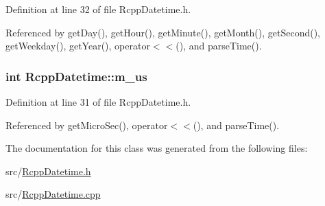 Definition at line 32 of file RcppDatetime.h.

Referenced by getDay(), getHour(), getMinute(), getMonth(), getSecond(), getWeekday(), getYear(), operator$<$$<$(), and parseTime().\hypertarget{classRcppDatetime_a68b9c7b759ffbba14aca3ae0680ea8a4}{
\subsubsection[{m\_\-us}]{\setlength{\rightskip}{0pt plus 5cm}int {\bf RcppDatetime::m\_\-us}}}
\label{classRcppDatetime_a68b9c7b759ffbba14aca3ae0680ea8a4}


Definition at line 31 of file RcppDatetime.h.

Referenced by getMicroSec(), operator$<$$<$(), and parseTime().

The documentation for this class was generated from the following files:\begin{DoxyCompactItemize}
\item 
src/\hyperlink{RcppDatetime_8h}{RcppDatetime.h}\item 
src/\hyperlink{RcppDatetime_8cpp}{RcppDatetime.cpp}\end{DoxyCompactItemize}
